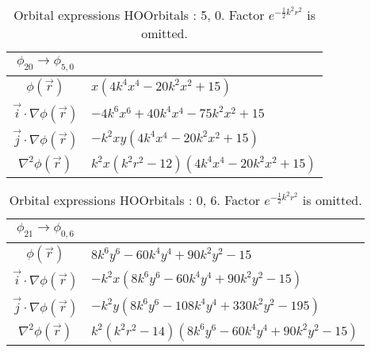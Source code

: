 \begin{table}
\begin{center}
\begin{tabular}{c|l}
$\phi_{20} \rightarrow \phi_{5, 0}$\\
\hline
$\phi(\vec r)$ & $x \left(4 k^{4} x^{4} - 20 k^{2} x^{2} + 15\right)$\\
\hline
$\vec i\cdot \nabla \phi(\vec r)$ & $- 4 k^{6} x^{6} + 40 k^{4} x^{4} - 75 k^{2} x^{2} + 15$\\
$\vec j\cdot \nabla \phi(\vec r)$ & $- k^{2} x y \left(4 k^{4} x^{4} - 20 k^{2} x^{2} + 15\right)$\\
\hline
$\nabla^2 \phi(\vec r)$ & $k^{2} x \left(k^{2} r^{2} -12\right) \left(4 k^{4} x^{4} - 20 k^{2} x^{2} + 15\right)$\\
\end{tabular}
\caption{Orbital expressions HOOrbitals : 5, 0. Factor $e^{- \frac{1}{2} k^{2} r^{2}}$ is omitted.}
\end{center}
\end{table}


\begin{table}
\begin{center}
\begin{tabular}{c|l}
$\phi_{21} \rightarrow \phi_{0, 6}$\\
\hline
$\phi(\vec r)$ & $8 k^{6} y^{6} - 60 k^{4} y^{4} + 90 k^{2} y^{2} -15$\\
\hline
$\vec i\cdot \nabla \phi(\vec r)$ & $- k^{2} x \left(8 k^{6} y^{6} - 60 k^{4} y^{4} + 90 k^{2} y^{2} -15\right)$\\
$\vec j\cdot \nabla \phi(\vec r)$ & $- k^{2} y \left(8 k^{6} y^{6} - 108 k^{4} y^{4} + 330 k^{2} y^{2} -195\right)$\\
\hline
$\nabla^2 \phi(\vec r)$ & $k^{2} \left(k^{2} r^{2} -14\right) \left(8 k^{6} y^{6} - 60 k^{4} y^{4} + 90 k^{2} y^{2} -15\right)$\\
\end{tabular}
\caption{Orbital expressions HOOrbitals : 0, 6. Factor $e^{- \frac{1}{2} k^{2} r^{2}}$ is omitted.}
\end{center}
\end{table}


